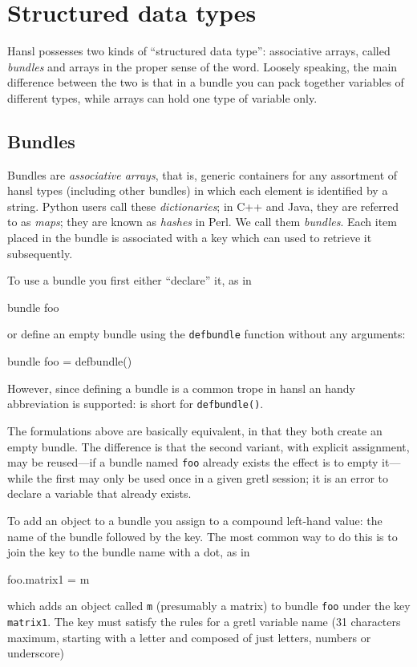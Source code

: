 \chapter{Structured data types}
\label{chap:structypes}

Hansl possesses two kinds of ``structured data type'': associative
arrays, called \emph{bundles} and arrays in the proper sense of the
word. Loosely speaking, the main difference between the two is that in
a bundle you can pack together variables of different types, while
arrays can hold one type of variable only.

\section{Bundles}
\label{sec:bundles}

Bundles are \emph{associative arrays}, that is, generic containers for
any assortment of hansl types (including other bundles) in which each
element is identified by a string. Python users call these
\emph{dictionaries}; in C++ and Java, they are referred to as
\emph{maps}; they are known as \emph{hashes} in Perl. We call them
\emph{bundles}. Each item placed in the bundle is associated with a
key which can used to retrieve it subsequently.

To use a bundle you first either ``declare'' it, as in
%
\begin{code}
bundle foo
\end{code}
%
or define an empty bundle using the \texttt{defbundle} function
without any arguments:
%
\begin{code}
bundle foo = defbundle()
\end{code}
%
However, since defining a bundle is a common trope in hansl an handy
abbreviation is supported: \cmd{\_()} is short for
\texttt{defbundle()}.

The formulations above are basically equivalent, in that they both
create an empty bundle. The difference is that the second variant,
with explicit assignment, may be reused---if a bundle named
\texttt{foo} already exists the effect is to empty it---while the
first may only be used once in a given gretl session; it is an error
to declare a variable that already exists.

To add an object to a bundle you assign to a compound left-hand value:
the name of the bundle followed by the key. The most common way to do
this is to join the key to the bundle name with a dot, as in
\begin{code}
  foo.matrix1 = m
\end{code}
which adds an object called \texttt{m} (presumably a matrix) to bundle
\texttt{foo} under the key \texttt{matrix1}. The key must satisfy the
rules for a gretl variable name (31 characters maximum, starting
with a letter and composed of just letters, numbers or underscore)


